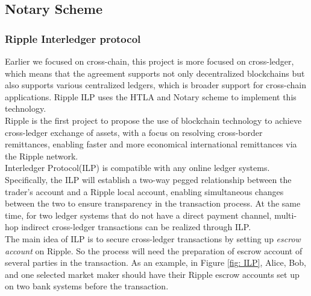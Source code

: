 \subsection{Notary Scheme}
\label{sec:notary}
\subsubsection{Ripple Interledger protocol}
\noindent Earlier we focused on cross-chain, this project is more focused on cross-ledger, which means that the agreement supports not only decentralized blockchains but also supports various centralized ledgers, which is broader support for cross-chain applications. Ripple ILP\cite{thomas2015protocol} uses the HTLA and Notary scheme to implement this technology.\\
\noindent Ripple is the first project to propose the use of blockchain technology to achieve cross-ledger exchange of assets, with a focus on resolving cross-border remittances, enabling faster and more economical international remittances via the Ripple network.\\
\noindent Interledger Protocol(ILP) is compatible with any online ledger systems. Specifically, the ILP will establish a two-way pegged relationship between the trader's account and a Ripple local account, enabling simultaneous changes between the two to ensure transparency in the transaction process. At the same time, for two ledger systems that do not have a direct payment channel, multi-hop indirect cross-ledger transactions can be realized through ILP. \\
\noindent The main idea of ILP is to secure cross-ledger transactions by setting up \textit{escrow account} on Ripple. So the process will need the preparation of escrow account of several parties in the transaction. As an example, in Figure \ref{fig: ILP}, Alice, Bob, and one selected market maker should have their Ripple escrow accounts set up on two bank systems before the transaction. \\
